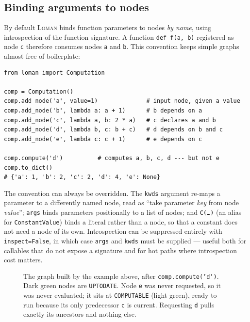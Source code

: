 \documentclass[11pt,a4paper]{article}
\newcommand{\loman}{\textsc{Loman}}
\newcommand{\code}[1]{\texttt{#1}}
\begin{document}
\subsection{Binding arguments to nodes}

By default \loman{} binds function parameters to nodes \emph{by name}, using
introspection of the function signature. A function \code{def f(a, b)}
registered as node \code{c} therefore consumes nodes \code{a} and \code{b}. This
convention keeps simple graphs almost free of boilerplate:

\begin{lstlisting}
from loman import Computation

comp = Computation()
comp.add_node('a', value=1)              # input node, given a value
comp.add_node('b', lambda a: a + 1)      # b depends on a
comp.add_node('c', lambda a, b: 2 * a)   # c declares a and b
comp.add_node('d', lambda b, c: b + c)   # d depends on b and c
comp.add_node('e', lambda c: c + 1)      # e depends on c

comp.compute('d')          # computes a, b, c, d --- but not e
comp.to_dict()
# {'a': 1, 'b': 2, 'c': 2, 'd': 4, 'e': None}
\end{lstlisting}

The convention can always be overridden. The \code{kwds} argument re-maps a
parameter to a differently named node, read as ``take parameter \emph{key} from
node \emph{value}''; \code{args} binds parameters positionally to a list of
nodes; and \code{C(\ldots)} (an alias for \code{ConstantValue}) binds a literal
rather than a node, so that a constant does not need a node of its own.
Introspection can be suppressed entirely with \code{inspect=False}, in which case
\code{args} and \code{kwds} must be supplied --- useful both for callables that
do not expose a signature and for hot paths where introspection cost matters.

\begin{figure}[t]
\centering
{}
\caption{The graph built by the example above, after \code{comp.compute('d')}.
Dark green nodes are \code{UPTODATE}. Node \code{e} was never requested, so it
was never evaluated; it sits at \code{COMPUTABLE} (light green), ready to run
because its only predecessor \code{c} is current. Requesting \code{d} pulls
exactly its ancestors and nothing else.}
\label{fig:dag}
\end{figure}
\end{document}
